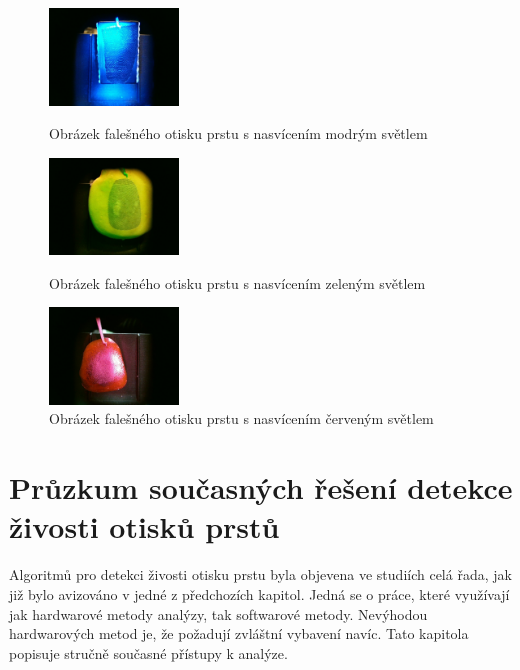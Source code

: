 \begin{figure}[!htbp]
  \begin{minipage}[b]{0.3\linewidth}
    \centering
    \includegraphics[width=130px]{obrazky-figures/fake23.jpg}
    \caption{Obrázek falešného otisku prstu s nasvícením modrým světlem}
  \end{minipage}
  \hspace{0.3cm}
  \begin{minipage}[b]{0.3\linewidth}
    \centering
    \includegraphics[width=130px]{obrazky-figures/fake64.jpg}
    \caption{Obrázek falešného otisku prstu s nasvícením zeleným světlem}
  \end{minipage}
  \hspace{0.3cm}
    \begin{minipage}[b]{0.3\linewidth}
    \centering
    \includegraphics[width=130px]{obrazky-figures/fake47.jpg}
    \caption{Obrázek falešného otisku prstu s nasvícením červeným světlem}
  \end{minipage}
\end{figure}

\chapter{Průzkum současných řešení detekce živosti otisků prstů}
\label{chap:Pruzkum}
Algoritmů pro detekci živosti otisku prstu byla objevena ve studiích celá řada, jak již bylo avizováno v jedné z předchozích kapitol. Jedná se o práce, které využívají jak hardwarové metody analýzy, tak softwarové metody. Nevýhodou hardwarových metod je, že požadují zvláštní vybavení navíc. Tato kapitola popisuje stručně současné přístupy k analýze.

